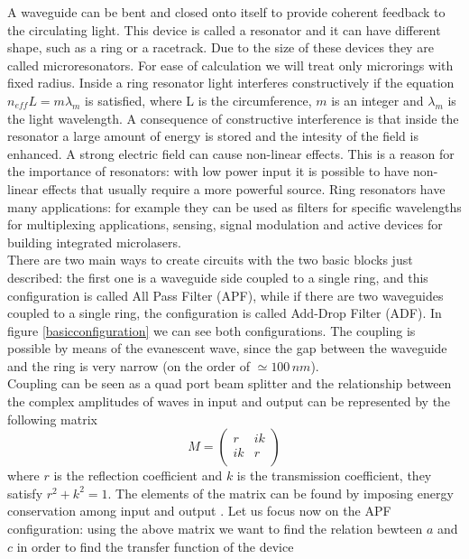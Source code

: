 A waveguide can be bent and closed onto itself to provide coherent feedback to the circulating light. This device is called a resonator and it can have different shape, such as a ring or a racetrack. Due to the size of these devices they are called microresonators. For ease of calculation we will treat only microrings with fixed radius. Inside a ring resonator light interferes constructively if the equation $n_{eff} L = m \lambda_m$ is satisfied, where L is the circumference, $m$ is an integer and $\lambda_m$ is the light wavelength. A consequence of constructive interference is that inside the resonator a large amount of energy is stored and the intesity of the field is enhanced. A strong electric field can cause non-linear effects. This is a reason for the importance of resonators: with low power input it is possible to have non-linear effects that usually require a more powerful source. Ring resonators have many applications: for example they can be used as filters for specific wavelengths for multiplexing applications, sensing, signal modulation and active devices for building integrated microlasers.\\
There are two main ways to create circuits with the two basic blocks just described: the first one is a waveguide side coupled to a single ring, and this configuration is called All Pass Filter (APF), while if there are two waveguides coupled to a single ring, the configuration is called Add-Drop Filter (ADF). In figure \ref{basicconfiguration} we can see both configurations. The coupling is possible by means of the evanescent wave, since the gap between the waveguide and the ring is very narrow (on the order of $\simeq 100\, nm$).\\
Coupling can be seen as a quad port beam splitter and the relationship between the complex amplitudes of waves in input and output can be represented by the following matrix
\begin{equation}M = \begin{pmatrix}
r & ik \\
ik & r\\
\end{pmatrix}\end{equation}
where $r$ is the reflection coefficient and $k$ is the transmission coefficient, they satisfy $r^2 +k^2 = 1$. The elements of the matrix can be found by imposing energy conservation among input and output \cite{thesis:masi}. Let us focus now on the APF configuration: using the above matrix we want to find the relation bewteen $a$ and $c$ in order to find the transfer function of the device
